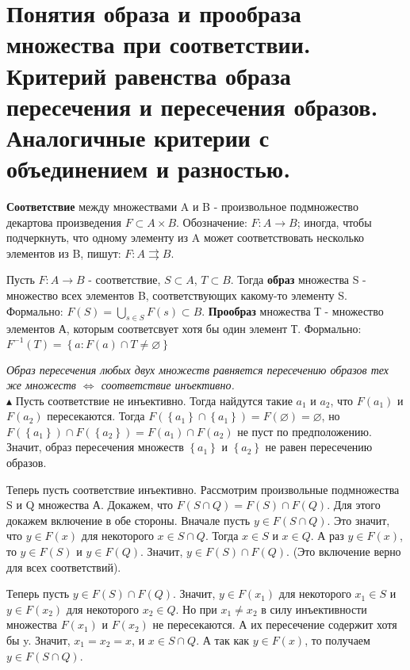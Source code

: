 \setcounter{section}{6}

\section{Понятия образа и прообраза множества при соответствии. Критерий равенства образа пересечения и пересечения образов. Аналогичные критерии с объединением и разностью.} 
\textbf{Соответствие} между множествами A и B - произвольное подмножество декартова произведения $F \subset A \times B$. Обозначение: $F: A \to B$; иногда, чтобы подчеркнуть, что одному элементу из A может соответствовать несколько элементов из B, пишут: $F:A\rightrightarrows B$. 
\\
\par
Пусть $F: A \to B$ - соответствие, $S \subset A$, $T \subset B$. Тогда \textbf{образ} множества S - множество всех элементов B, соответствующих какому-то элементу S. Формально: $F(S) = \bigcup_{s \in S} F(s) \subset B $. \textbf{Прообраз} множества Т - множество элементов А, которым соответсвует хотя бы один элемент Т. Формально: $F^{-1}(T) = \left\{ a: F(a) \cap T \neq \varnothing \right\}$ 
\\
\par
\emph{ Образ пересечения любых двух множеств равняется пересечению образов тех же множеств $\iff$ соответствие инъективно. } 
\\
$\blacktriangle$
Пусть соответствие не инъективно. Тогда найдутся такие $a_1$ и $a_2$, что $F(a_1)$ и $F(a_2)$ пересекаются. Тогда $F(\left\{a_1\right\} \cap \left\{a_1\right\}) = F(\varnothing) = \varnothing$, но $F(\left\{a_1\right\}) \cap F(\left\{a_2\right\}) = F(a_1) \cap F(a_2)$ не пуст по предположению. Значит, образ пересечения множеств $\left\{ a_1\right\}$ и $\left\{ a_2\right\}$ не равен пересечению образов. \par
Теперь пусть соответствие инъективно. Рассмотрим произвольные подмножества S и Q множества А. Докажем, что $F(S \cap Q) = F(S) \cap F(Q)$. Для этого докажем включение в обе стороны. Вначале пусть $y \in F(S \cap Q)$. Это значит, что $y \in F(x)$ для некоторого $x \in S \cap Q$. Тогда $x \in S$ и $x \in Q$. А раз $y \in F(x)$, то $y \in F(S)$ и $y \in F(Q)$. Значит, $y \in F(S) \cap F(Q)$. (Это включение верно для всех соответствий). \par
Теперь пусть $y \in F(S) \cap F(Q)$. Значит, $y \in F(x_1)$ для некоторого $x_1 \in S$ и $y \in F(x_2)$ для некоторого $x_2 \in Q$. Но при $x_1 \neq x_2$ в силу инъективности множества $F(x_1)$ и $F(x_2)$ не пересекаются. А их пересечение содержит хотя бы y. Значит, $x_1 = x_2 = x$, и $x \in S \cap Q$. А так как $y \in F(x)$, то получаем $y \in F(S \cap Q)$.
